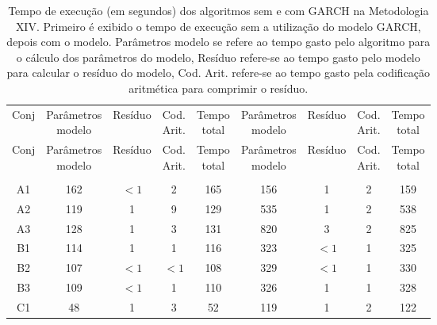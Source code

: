 \begin{center}
\begin{longtable}{ccccc|cccc}
\toprule
\rowcolor{white}
\caption[Metodologia XIV: tempo de execução]{Tempo de execução (em segundos)
dos algoritmos sem e com GARCH na Metodologia XIV. Primeiro é exibido o tempo de
execução sem a utilização do modelo GARCH, depois com o modelo. Parâmetros
modelo se refere ao tempo gasto pelo algoritmo para o cálculo dos parâmetros do
modelo, Resíduo refere-se ao tempo gasto pelo modelo para calcular o resíduo do
modelo, Cod. Arit. refere-se ao tempo gasto pela codificação aritmética para
comprimir o resíduo.} \label{tab:EvolucaoEntropiaMet14}\\
\midrule
Conj & \specialcell{Parâmetros\\modelo} &
Resíduo & \specialcell{Cod.\\Arit.} & \specialcell{Tempo\\total} &
\specialcell{Parâmetros\\modelo} &
Resíduo & \specialcell{Cod.\\Arit.} & \specialcell{Tempo\\total} \\
\midrule
\endfirsthead 
\midrule
\rowcolor{white}
Conj & \specialcell{Parâmetros\\modelo} &
Resíduo & \specialcell{Cod.\\Arit.} & \specialcell{Tempo\\total} &
\specialcell{Parâmetros\\modelo} &
Resíduo & \specialcell{Cod.\\Arit.} & \specialcell{Tempo\\total} \\
\toprule
\endhead
\midrule \\ %
\endfoot
\bottomrule 
\endlastfoot
A1&162&$<1$&2&165&156&1&2&159\\
A2&119&1&9&129&535&1&2&538\\
A3&128&1&3&131&820&3&2&825\\
B1&114&1&1&116&323&$<1$&1&325\\
B2&107&$<1$&$<1$&108&329&$<1$&1&330\\
B3&109&$<1$&1&110&326&1&1&328\\
C1&48&1&3&52&119&1&2&122\\

\end{longtable}
\end{center}
